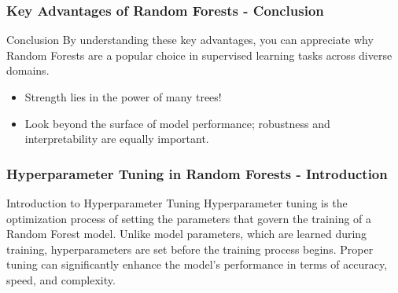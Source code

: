 \documentclass[aspectratio=169]{beamer}
\begin{document}
\begin{frame}[fragile]
    \frametitle{Key Advantages of Random Forests - Conclusion}
    \begin{block}{Conclusion}
        By understanding these key advantages, you can appreciate why Random Forests are a popular choice in supervised learning tasks across diverse domains.
    \end{block}
    \begin{itemize}
        \item Strength lies in the power of many trees!
        \item Look beyond the surface of model performance; robustness and interpretability are equally important.
    \end{itemize}
\end{frame}

\begin{frame}[fragile]
    \frametitle{Hyperparameter Tuning in Random Forests - Introduction}
    \begin{block}{Introduction to Hyperparameter Tuning}
        Hyperparameter tuning is the optimization process of setting the parameters that govern the training of a Random Forest model. Unlike model parameters, which are learned during training, hyperparameters are set before the training process begins. Proper tuning can significantly enhance the model's performance in terms of accuracy, speed, and complexity.
    \end{block}
\end{frame}
\end{document}
